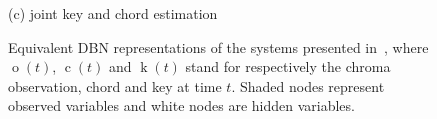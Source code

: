 \documentclass[letterpaper]{article} %
\begin{document}
\begin{figure}[htb]
\begin{minipage}[t]{\linewidth}
  \centerline{(c) joint key and chord estimation}\medskip
\end{minipage}
%
\caption{Equivalent DBN representations of the systems presented in~\cite{papadopoulos2012ismir}, where $\operatorname{o}\left(t\right)$, $\operatorname{c}\left(t\right)$ and $\operatorname{k}\left(t\right)$ stand for respectively the chroma observation, chord and key at time $t$. Shaded nodes represent observed variables and white nodes are hidden variables.}
\label{fig:dbns}
\end{figure}
\end{document}
